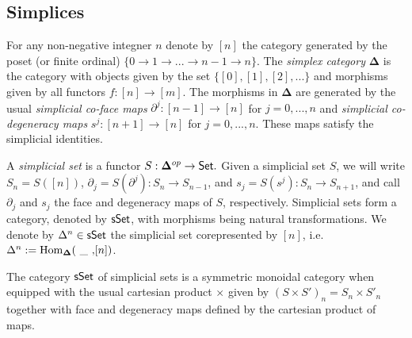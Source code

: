 
\subsection{Simplices} 
For any non-negative integner $n$ denote by $[n]$ the category generated by the poset (or finite ordinal) $\{0 \to 1 \to ... \to n-1 \to n\}$. The \textit{simplex category} $\mathbf{\Delta}$ is the category with objects given by the set $\{ [0], [1], [2], ...\}$ and morphisms given by all functors $f: [n] \to [m]$. The morphisms in $\mathbf{\Delta}$ are generated by the usual
\textit{simplicial co-face maps} $\partial^j: [n-1] \to [n]$ for $j=0,...,n$ and \textit{simplicial co-degeneracy maps} $s^j: [n+1] \to [n]$ for $j=0,...,n.$ These maps satisfy the simplicial identities.

A \textit{simplicial set} is a functor $S: \mathbf{\Delta}^{op} \to \mathsf{Set}.$ Given a simplicial set $S$, we will write $S_n= S( [n] )$, $\partial_j = S( \partial^j): S_n \to S_{n-1}$, and $s_j= S(s^j): S_n \to S_{n+1}$, and call $\partial_j$ and $s_j$ the face and degeneracy maps of $S$, respectively. Simplicial sets form a category, denoted by $\mathsf{sSet}$, with morphisms being natural transformations.  We denote by $\Delta^n \in \mathsf{sSet}$ the simplicial set corepresented by $[n]$, i.e. $\Delta^n:= \mathrm{Hom}_{\mathbf{\Delta}}(\text{ \_ ,}  [n])$. 

The category $\mathsf{sSet}$ of simplicial sets is a symmetric monoidal category when equipped with the usual cartesian product $\times$ given by $(S \times S')_n =S_n \times S'_n$ together with face and degeneracy maps defined by the cartesian product of maps. 